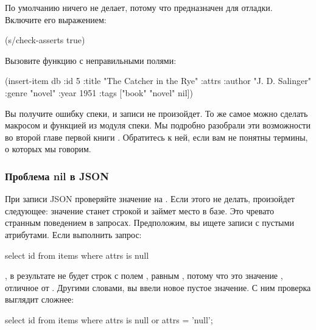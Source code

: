 По умолчанию  ничего не делает, потому что предназначен для отладки. Включите его выражением:

\begin{english}
  \begin{clojure}
(s/check-asserts true)
  \end{clojure}
\end{english}

Вызовите функцию с неправильными полями:

\begin{english}
  \begin{clojure}
(insert-item db {:id 5
                 :title "The Catcher in the Rye"
                 :attrs {:author "J. D. Salinger"
                         :genre "novel"
                         :year 1951}
                 :tags ["book" "novel" nil]})
  \end{clojure}
\end{english}

Вы получите ошибку спеки, и записи не произойдет. То же самое можно сделать макросом  и функцией  из модуля спеки. Мы подробно разобрали эти возможности во второй главе первой книги . Обратитесь к ней, если вам не понятны термины, о которых мы говорим.

\subsubsection{Проблема nil в JSON}

При записи JSON проверяйте значение на . Если этого не делать, произойдет следующее: значение  станет строкой  и займет место в базе. Это чревато странным поведением в запросах. Предположим, вы ищете записи с пустыми атрибутами. Если выполнить запрос:

\begin{english}
  \begin{sql}
select id from items where attrs is null
  \end{sql}
\end{english}

, в результате не будет строк с полем , равным , потому что это значение , отличное от . Другими словами, вы ввели новое пустое значение. С ним проверка выглядит сложнее:

\begin{english}
  \begin{sql}
select id from items where attrs is null or attrs = 'null';
  \end{sql}
\end{english}

